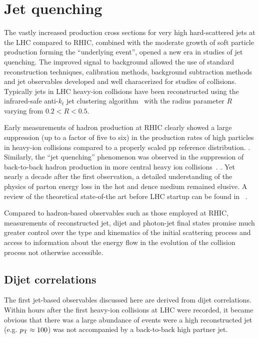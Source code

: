 \section{Jet quenching}
\label{jets_intro}

The vastly increased production cross sections for very high \pT hard-scattered jets at the LHC
compared to RHIC, combined with the moderate growth of soft particle production forming the ``underlying
event'', opened a new era in studies of jet quenching. The improved signal to background allowed the 
use of standard reconstruction techniques, calibration methods, background subtraction methods and 
jet observables developed and well characerized for studies of \pp collisions. 
Typically jets in LHC heavy-ion collisions have been reconstructed using 
the infrared-safe anti-$k_t$ jet clustering algorithm~\cite{Cacciari:2008gp} with the 
radius parameter $R$ varying from $0.2 < R  < 0.5$.

Early measurements of hadron production at RHIC
clearly showed a large suppression (up to a factor of five to six) in the production rates of 
high \pT particles in heavy-ion collisions compared to a properly scaled pp reference distribution. 
\cite{Adcox:2001jp,Adler:2002xw}. Similarly, the ``jet quenching'' phenomenon was observed 
in the suppression of back-to-back hadron production
in more central heavy ion collisions~\cite{Adler:2002xw}. 
\cite{Adcox:2001jp,Adler:2002xw}. Yet nearly a decade after the first observation, a detailed 
understanding of the physics of parton energy loss in the hot and dence medium remained
elusive. A review of the theoretical state-of-the art before LHC startup can be 
found in ~\cite{Wiedemann:2009sh}.

Compared to hadron-based observables such as those employed at RHIC, measurements of reconstructed
jet, dijet and photon-jet final states promise much greater control over the type and kinematics
of the initial scattering process and access to information about the energy flow in the evolution
of the collision process not otherwise accessible. 

\subsection{Dijet correlations}

The first jet-based observables discussed here are derived from dijet correlations. Within hours
after the first heavy-ion collisions at LHC were recorded, it became obvious that there was
a large abundance of events were a high \pT reconstructed jet (e.g. $\mbox{$p_{\mathrm{T}}$} \approx 100$\GeVc) was
not accompanied by a back-to-back high \pT partner jet.

